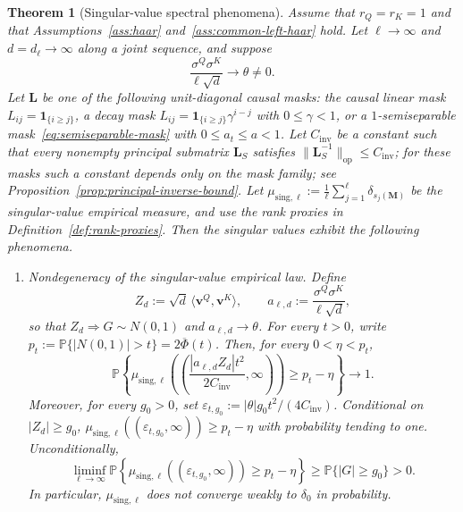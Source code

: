 \documentclass{article}
\newcommand{\Prob}{\mathbb{P}}
\newcommand{\op}{\operatorname{op}}
\newcommand{\weak}{\Rightarrow}
\newcommand{\one}{\mathbf{1}}
\newcommand{\bM}{\mathbf{M}}
\newcommand{\bL}{\mathbf{L}}
\newcommand{\bv}{\mathbf{v}}
\newcommand{\barPhi}{\overline{\Phi}}
\newtheorem{theorem}{Theorem}
\theoremstyle{definition}
\theoremstyle{remark}
\begin{document}
\begin{theorem}[Singular-value spectral phenomena]
Assume that $r_Q=r_K=1$ and that Assumptions~\ref{ass:haar}
and~\ref{ass:common-left-haar} hold.  Let $\ell\to\infty$ and
$d=d_\ell\to\infty$
along a joint sequence, and suppose
\[
    \frac{\sigma^Q\sigma^K}{\ell\sqrt d}\longrightarrow \theta\neq0.
\]
Let $\bL$ be one of the following unit-diagonal causal masks: the causal linear
mask $L_{ij}=\one_{\{i\geq j\}}$, a decay mask
$L_{ij}=\one_{\{i\geq j\}}\gamma^{i-j}$ with $0\leq\gamma<1$, or a
$1$-semiseparable mask~\eqref{eq:semiseparable-mask} with
$0\leq a_t\leq a<1$.  Let $C_{\mathrm{inv}}$ be a constant such that every
nonempty principal submatrix $\bL_S$ satisfies
$\|\bL_S^{-1}\|_{\op}\leq C_{\mathrm{inv}}$; for these masks such a constant
depends only on the mask family; see
Proposition~\ref{prop:principal-inverse-bound}.  Let
\(
    \mu_{\mathrm{sing},\ell}
    :=
    \frac{1}{\ell}\sum_{j=1}^{\ell}\delta_{s_j(\bM)}
\)
be the singular-value empirical measure, and use the rank proxies in
Definition~\ref{def:rank-proxies}.  Then the singular values exhibit the
following phenomena.

\begin{enumerate}
\item[(i)] Nondegeneracy of the singular-value empirical law.  Define
\[
    Z_d:=\sqrt d\,\langle\bv^Q,\bv^K\rangle,
    \qquad
    a_{\ell,d}:=\frac{\sigma^Q\sigma^K}{\ell\sqrt d},
\]
so that $Z_d\weak G\sim N(0,1)$ and $a_{\ell,d}\to\theta$.  For every
$t>0$, write $p_t:=\Prob\{|N(0,1)|>t\}=2\barPhi(t)$.  Then, for every
$0<\eta<p_t$,
\begin{equation}
    \Prob\left\{
        \mu_{\mathrm{sing},\ell}
        \left(
            \left(
            \frac{|a_{\ell,d}Z_d|t^2}{2C_{\mathrm{inv}}},
            \infty
            \right)
        \right)
        \geq p_t-\eta
    \right\}
    \longrightarrow1.
    \label{eq:singular-noncollapse}
\end{equation}
Moreover, for every $g_0>0$, set
$\varepsilon_{t,g_0}:=|\theta|g_0t^2/(4C_{\mathrm{inv}})$.  Conditional on
$|Z_d|\geq g_0$,
$\mu_{\mathrm{sing},\ell}((\varepsilon_{t,g_0},\infty))\geq p_t-\eta$
with probability tending to one.  Unconditionally,
\begin{equation}
    \liminf_{\ell\to\infty}
    \Prob\left\{
        \mu_{\mathrm{sing},\ell}
        ((\varepsilon_{t,g_0},\infty))
        \geq p_t-\eta
    \right\}
    \geq \Prob\{|G|\geq g_0\}>0.
    \label{eq:singular-noncollapse-deterministic}
\end{equation}
In particular, $\mu_{\mathrm{sing},\ell}$ does not converge weakly to
$\delta_0$ in probability.


\end{enumerate}
\end{theorem}
\end{document}
